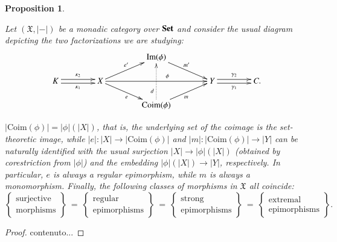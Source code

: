 \documentclass[12pt]{article}
\newtheorem{proposition}[lemma]{Proposition}
\theoremstyle{definition}
\def\X{\mathfrak X}
\def\Coim{\mathrm{Coim}}
\def\Im{\mathrm{Im}}
\newcommand{\Set}{\textbf{\textup{Set}}}
\numberwithin{equation}{section}
\begin{document}
\iffalse 
\begin{proposition}\label{algebraic_factorization_prop} 
	
	Let $(\X, |-|)$ be a monadic category  over $\Set$ and consider the usual diagram depicting the two factorizations we are studying: 
	\[
	\xymatrix@C=40pt@R=15pt{
		&& \Im(\phi) \ar[dr]^{m'}  & & \\ 
		K \ar@<-.5ex>[r]_-{\kappa_1} \ar@<.5ex>[r]^-{\kappa_2} &X \ar[ru]^{e'} \ar[rr]^(0.6){\phi}\ar[dr]_{e}&  & Y \ar@<-.5ex>[r]_-{\gamma_1} \ar@<.5ex>[r]^-{\gamma_2} & C.\\
		& & \Coim(\phi) \ar[ur]_{m} \ar@{.>}[uu]^(0.3){d}  &  &
	}
	\] 
	
	
	$|\Coim(\phi)|=|\phi|(|X|)$, that is, the underlying set of the coimage is the set-theoretic image, while $|e|\colon |X|\to |\Coim(\phi)|$ and $|m|\colon |\Coim(\phi)|\to |Y|$ can be naturally identified with the usual surjection $|X|\to |\phi|(|X|)$ (obtained by corestriction from $|\phi|$) and the embedding $|\phi|(|X|)\to |Y|$, respectively. In particular, $e$ is always a regular epimorphism, while $m$ is always a monomorphism. Finally, the following classes of morphisms in $\X$ all coincide:
	\[
	\left\{ \begin{matrix}\text{surjective}\\\text{morphisms}\end{matrix}\right\}\ \overset{}=\ \left\{ \begin{matrix}\text{regular}\\\text{epimorphisms}\end{matrix}\right\}\ \overset{}=\ \left\{ \begin{matrix}\text{strong}\\\text{epimorphisms}\end{matrix}\right\}\ \overset{}=\ \left\{ \begin{matrix}\text{extremal}\\\text{epimorphisms}\end{matrix}\right\}.
	\]
\end{proposition} 
\begin{proof}
	contenuto...
\end{proof}
\end{document}
